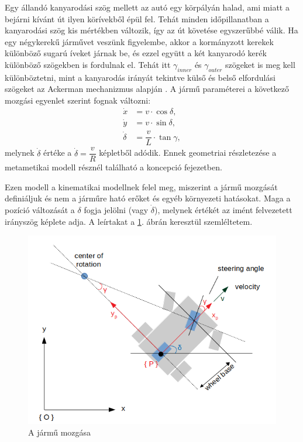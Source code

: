 Egy állandó kanyarodási szög mellett az autó egy körpályán halad, ami miatt a bejárni kívánt út ilyen körívekből épül fel. Tehát minden időpillanatban a kanyarodási szög kis mértékben változik, így az út követése egyszerűbbé válik. Ha egy négykerekű járművet veszünk figyelembe, akkor a kormányzott kerekek különböző sugarú íveket járnak be, és ezzel együtt a két kanyarodó kerék különböző szögekben is fordulnak el. Tehát itt $\gamma_{inner}$ és $\gamma_{outer}$ szögeket is meg kell különböztetni, mint a kanyarodás irányát tekintve külső és belső elfordulási szögeket az Ackerman mechanizmus alapján \cite{Ackerman}. 
A jármű paraméterei a következő mozgási egyenlet szerint fognak változni:
\begin{align*}
\dot{x} &= v \cdot \cos\delta, \\
\dot{y} &= v \cdot \sin\delta, \\
\dot{\delta} &= \dfrac{v}{L} \cdot \tan\gamma,
\end{align*}
melynek $\dot{\delta}$ értéke a $\dot{\delta} = \dfrac{v}{R}$ képletből adódik. Ennek geometriai részletezése a metametikai modell résznél található a koncepció fejezetben. 

Ezen modell a kinematikai modellnek felel meg, miszerint a jármű mozgását definiáljuk és nem a járműre ható erőket és egyéb környezeti hatásokat. Maga a pozíció változását a $\delta$ fogja jelölni (vagy $\dot{\delta}$), melynek értékét az imént felvezetett irányszög képlete adja. A leírtakat a \ref{fig:position}. ábrán keresztül szemléltetem.

\begin{figure}[h!]
\centering
\includegraphics[scale=0.70]{images/position.png}
\caption{A jármű mozgása}
\label{fig:position}
\end{figure}

